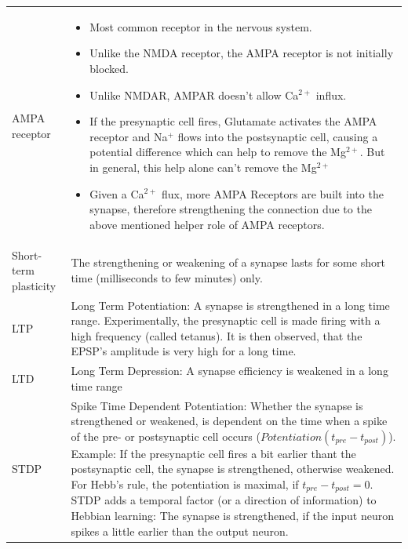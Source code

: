 \begin{longtable}{p{4cm}p{15cm}}
AMPA receptor		& \begin{itemize}
				\item Most common receptor in the nervous system.
            		  	\item Unlike the NMDA receptor, the AMPA receptor is not initially blocked.
				\item Unlike NMDAR, AMPAR doesn't allow Ca$^{2+}$ influx.
				\item If the presynaptic cell fires, Glutamate activates the AMPA receptor and Na$^+$ flows into the postsynaptic cell, causing a potential difference which can help to remove the Mg$^{2+}$. But in general, this help alone can't remove the Mg$^{2+}$
				\item Given a Ca$^{2+}$ flux, more AMPA Receptors are built into the synapse, therefore strengthening the connection due to the above mentioned helper role of AMPA receptors.
            		  \end{itemize}\\
Short-term plasticity	& The strengthening or weakening of a synapse lasts for some short time (milliseconds to few minutes) only.\\
LTP			& Long Term Potentiation: A synapse is strengthened in a long time range. Experimentally, the presynaptic cell is made firing with a high frequency (called tetanus). It is then observed, that the EPSP's amplitude is very high for a long time.\\
LTD			& Long Term Depression: A synapse efficiency is weakened in a long time range\\
STDP			& Spike Time Dependent Potentiation: Whether the synapse is strengthened or weakened, is dependent on the time when a spike of the pre- or postsynaptic cell occurs ($Potentiation(t_{pre} - t_{post})$). Example: If the presynaptic cell fires a bit earlier thant the postsynaptic cell, the synapse is strengthened, otherwise weakened. For Hebb's rule, the potentiation is maximal, if $t_{pre} - t_{post} = 0$. STDP adds a temporal factor (or a direction of information) to Hebbian learning: The synapse is strengthened, if the input neuron spikes a little earlier than the output neuron.\\

\end{longtable}
